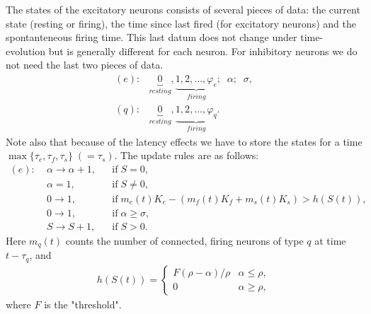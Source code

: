 \documentclass[12pt]{article}
\numberwithin{equation}{section}
\begin{document}
The states of the excitatory neurons consists of several pieces of data: the current state (resting or firing), the time since last fired (for excitatory neurons) and the spontanteneous firing time. This last datum does not change under time-evolution but is generally different for each neuron. For inhibitory neurons we do not need the last two pieces of data. 
\begin{align}
(e): & \underbrace{0}_{resting}, \underbrace{1, 2, ..., \varphi_e}_{firing}; \; \; \alpha; \; \; \sigma, \\
(q): & \underbrace{0}_{resting}, \underbrace{1, 2, ..., \varphi_q}_{firing}. 
\end{align}
Note also that because of the latency effects we have to store the states for a time \(\max\{\tau_e,\tau_f,\tau_s\} \; (=\tau_s)\). 
The update rules are as follows:
\begin{align}
(e): \;& \alpha \rightarrow \alpha +1, && \mathrm{if} \; S = 0, \\
& \alpha = 1, &&\mathrm{if} \; S \neq 0, \\
& 0 \rightarrow 1, && \mathrm{if} \; m_e(t) K_e -(m_f(t)K_f+m_s(t)K_s) > h(S(t)), \\
& 0 \rightarrow 1, && \mathrm{if} \; \alpha \geq \sigma, \\
& S \rightarrow S +1, && \mathrm{if} \; S>0.
\end{align}
Here \(m_q(t)\) counts the number of connected, firing neurons of type \(q\) at time \(t-\tau_q\), and
\begin{align}
h(S(t)) =\begin{cases} F(\rho-\alpha)/\rho & \alpha \leq \rho, \\ 0 & \alpha \geq \rho,\end{cases}
\end{align}
where \(F\) is the "threshold". 
\end{document}
